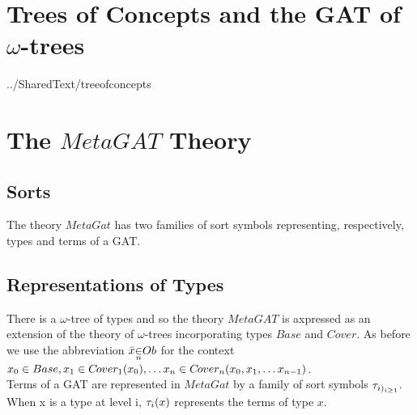 \documentclass[10pt,a4paper]{article}
\begin{document}
\iffalse
A citizen in the context of a triangle is written as:
$$
triangle \cross citizen
$$
and since a citizen needs a country for context:
$$
country \base citizen
$$
 therefore $triangle \cross citizen$ requires $triangle \cross country$:
$$ triangle \cross country \base triangle \cross citizen$$.



One citizen in the context of another, when written as:
$$citizen \cross citizen$$
is ambiguous and is therefore written instead as:
$$citizen \cross_{country} citizen$$
if we imagine a citizen of the same country or is written as as
$$citizen \cross_1 citizen$$
if we imagine absolutely any other citizen of any country whatsoever, 
where $1$ represents \textit{the absolute}. 

Particularisation of  citizen to instance france of country is written as
$france^*citizen$.
\fi

\section{Trees of Concepts and the GAT of $\omega$-trees}
 {../SharedText/treeofconcepts}


\section{The $MetaGAT$ Theory}

\subsection*{Sorts}
The theory $MetaGat$ has two families of sort symbols representing, respectively,  types and terms of a GAT. \\
\subsection{Representations of Types}


There is a $\omega$-tree of types and so the theory $MetaGAT$ is axpressed as an extension of the theory
of $\omega$-trees incorporating types $Base$ and $Cover$. As before we use the abbreviation 
$\ofTn{x}{n}{\genericOb}$ for the context $x_0 \in Base,x_1 \in C\kern-1pt over_{1}(x_0), \hdots x_n \in C\kern-1pt over_{n}(x_0,x_1,\hdots x_{n-1}) $. \\


\noindent Terms of a GAT are represented in $MetaGat$ by a family of 
sort symbols $\tau_{i)_{i\geq 1}}$. 
When x is a type at level i, $\tau_i(x)$ represents the terms of type $x$. 
\end{document}
